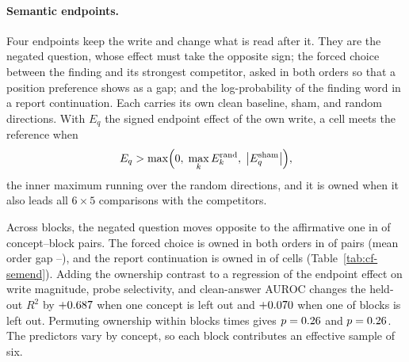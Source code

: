\documentclass[11pt]{article}
\begin{document}
\paragraph{Semantic endpoints.} Four endpoints keep the write and change what is read after it. They are the negated question, whose effect must take the opposite sign; the forced choice between the finding and its strongest competitor, asked in both orders so that a position preference shows as a gap; and the log-probability of the finding word in a report continuation. Each carries its own clean baseline, sham, and \cfSemLedgerRandom{} random directions. With $E_q$ the signed endpoint effect of the own write, a cell meets the reference when
\begin{equation}
E_q>\max\Bigl(0,\;\max_{k}E^{\mathrm{rand}}_{k},\;\bigl|E^{\mathrm{sham}}_q\bigr|\Bigr),
\label{eq:endpoint-reference}
\end{equation}
the inner maximum running over the \cfSemLedgerRandom{} random directions, and it is owned when it also leads all $6\times5$ comparisons with the competitors.

Across \cfSemBlocks{} blocks, the negated question moves opposite to the affirmative one in \cfSemNegOpposite{} of \cfSemNegN{} concept--block pairs. The forced choice is owned in both orders in \cfSemForcedOwned{} of \cfSemForcedN{} pairs (mean order gap \cfSemGapMin{}--\cfSemGapMax{}), and the report continuation is owned in \cfSemReportOwned{} of \cfSemReportCells{} cells (Table~\ref{tab:cf-semend}). Adding the ownership contrast to a regression of the endpoint effect on write magnitude, probe selectivity, and clean-answer AUROC changes the held-out $R^2$ by $+0.687$ when one concept is left out and $+0.070$ when one of \cfSemCvBlocks{} blocks is left out. Permuting ownership within blocks \cfSemCvPerms{} times gives $p=0.26$ and $p=0.26$. The predictors vary by concept, so each block contributes an effective sample of six.
\end{document}
